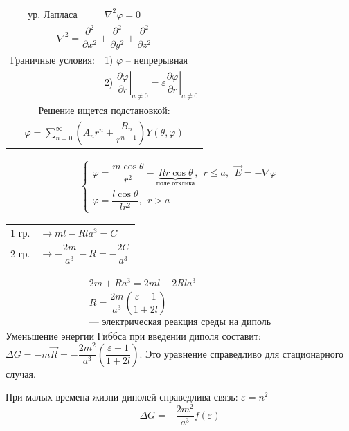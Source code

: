 \begin{lecture}
\begin{lecSection}
		\begin{tabular}{cl}
			ур. Лапласа & $ \nabla^2 \varphi = 0 $ \\
			\multicolumn{2}{c}{$ \nabla^2 = \dfrac{\partial^2}{\partial x^2} + \dfrac{\partial^2}{\partial y^2} + \dfrac{\partial^2}{\partial z^2} $} \\
			Граничные условия: & 1) $ \varphi $ -- непрерывная \\
							  & 2) $ \left.\dfrac{\partial \varphi}{\partial r} \right|_{a \neq 0} = \varepsilon \left. \dfrac{\partial \varphi}{\partial r} \right|_{a \neq 0} $ \\
			\multicolumn{2}{c}{Решение ищется подстановкой:} \\
			\multicolumn{2}{c}{$ \varphi = \sum\limits_{n=0}^\infty \left( A_n r^n + \dfrac{B_n}{r^{n+1}} \right) Y (\theta, \varphi) $}
		\end{tabular}
		
		\begin{gather*}
			\begin{cases}
				\varphi = \dfrac{m \cos \theta}{r^2} - \underbrace{R r \cos \theta}_{ \text{поле отклика} }, ~~ r \leq a, ~~ \vec{E} = - \nabla \varphi \\
				\varphi = \dfrac{l \cos \theta}{l r^2}, ~~ r > a
			\end{cases}
		\end{gather*}
		\begin{center}\begin{tabular}{cl}
			1 гр. & $ \rightarrow ml - R l a^3 = C $ \\
			2 гр. & $ \rightarrow -\dfrac{2m}{a^3} - R = -\dfrac{2C}{a^3} $ \\
		\end{tabular}\end{center}
		\hspace{2cm}
		\begin{gather}
			\nonumber
			2m + R a^3 = 2 ml - 2Rl a^3 \\
			\boxed{ R = \dfrac{2m}{a^3} \left( \dfrac{\varepsilon - 1}{1 + 2l} \right) } \\
			\nonumber
			\text{--- электрическая реакция среды на диполь}
		\end{gather}
		Уменьшение энергии Гиббса при введении диполя составит: $ \Delta G = - m \vec{R} = - \dfrac{2 m^2}{a^3} \left( \dfrac{\varepsilon - 1}{1 + 2l} \right) $. Это уравнение справедливо для стационарного случая.
		
		При малых времена жизни диполей справедлива связь: $ \varepsilon = n^2 $
		\begin{equation}
			\Delta G = - \dfrac{2 m^2}{a^3} f( \varepsilon )
			\label{eq:deltaG_from_epsilon}
		\end{equation}
		

\end{lecSection}
\end{lecture}
